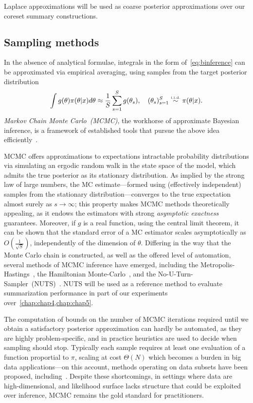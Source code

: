 Laplace approximations will be used as coarse posterior approximations over our coreset summary constructions.

\subsection{Sampling methods}
\label{subsec:b-sampling-methods}
In the absence of analytical formulae, integrals in the form of~\cref{eq:binference} can be approximated via empirical averaging, using samples from the target posterior distribution
\[
 \int g(\theta) \pi(\theta|x) d\theta \approx \frac{1}{S} \sum_{s=1}^{S} g(\theta_s), \quad (\theta_s)_{s=1}^{S} \distiid \pi(\theta|x) .
\]
\emph{Markov Chain Monte Carlo~(MCMC)}, the workhorse of approximate Bayesian inference, is a framework of established tools that pursue the above idea efficiently~\citep{geyer92, gilks05, robert05}. 

MCMC offers approximations to expectations \wrt intractable probability distributions via simulating an ergodic random walk in the state space of the model, which admits the true posterior as its stationary distribution. As implied by the strong law of large numbers, the MC estimate---formed using (effectively independent) samples from the stationary distribution---converges to the true expectation almost surely as $s \rightarrow \infty$; this property makes MCMC methods theoretically appealing, as it endows the estimators with strong \emph{asymptotic exactness} guarantees. Moreover, if $g$ is a real function, using the central limit theorem, it can be shown that the standard error of a MC estimator scales asymptotically as $O(\frac{1}{\sqrt{S}})$, independently of the dimension of $\theta$. Differing in the way that the Monte Carlo chain is constructed, as well as the offered level of automation, several methods of MCMC inference have emerged, including the Metropolis-Hastings~\citep{andrieu03}, the Hamiltonian Monte-Carlo~\citep{neal11}, and the No-U-Turn-Sampler~(NUTS)~\citep{hoffman14}. NUTS will be used as a reference method to evaluate summarization performance in part of our experiments over~\cref{chap:chap4,chap:chap5}.

The computation of bounds on the number of MCMC iterations required until we obtain a satisfactory posterior approximation can hardly be automated, as they are highly problem-specific, and in practice heuristics are used to decide when sampling should stop. Typically each sample requires at least one evaluation of a function proportial to $\pi$, scaling at cost $\Theta(N)$ which becomes a burden in big data applications---on this account, methods operating on data subsets have been proposed, including~\citep{welling11,korattikara14,bardenet14}. Despite these shortcomings, in settings where data are high-dimensional, and likelihood surface lacks structure that could be exploited over inference, MCMC remains the gold standard for practitioners.



